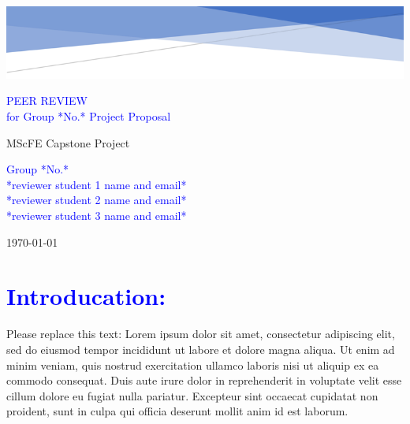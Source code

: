 \documentclass[a4paper, 11pt]{article}
\begin{document}
\begin{center}
    \vspace*{-3.9cm} \hspace*{-2.3cm} \includegraphics[width=20.6cm]{header.png}
\end{center}

\vspace*{11cm}
\begin{flushright}
    \Huge \textcolor{blue}{PEER REVIEW \\ for Group *No.* Project Proposal}
    
    \vspace*{0.5cm} \Large MScFE Capstone Project
    
    \vspace*{1.5cm} \large 
    \textcolor{blue}{Group *No.* \\ 
        *reviewer student 1 name and email* \\ 
        *reviewer student 2 name and email* \\ 
        *reviewer student 3 name and email* \\
    }
    
    \vspace*{0.5cm} \today
\end{flushright}
\vspace*{1cm} \newpage


\section*{\textcolor{blue}{Introducation:}}

Please replace this text: Lorem ipsum dolor sit amet, consectetur adipiscing elit, sed do eiusmod tempor incididunt ut labore et dolore magna aliqua. Ut enim ad minim veniam, quis nostrud exercitation ullamco laboris nisi ut aliquip ex ea commodo consequat. Duis aute irure dolor in reprehenderit in voluptate velit esse cillum dolore eu fugiat nulla pariatur. Excepteur sint occaecat cupidatat non proident, sunt in culpa qui officia deserunt mollit anim id est laborum.
\end{document}
